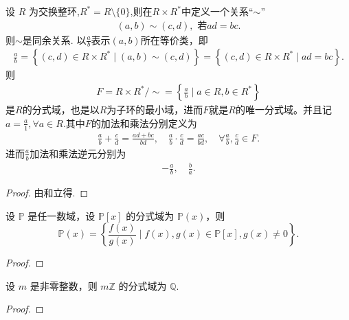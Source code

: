\documentclass[../../main.tex]{subfiles}%
\begin{document}
\begin{corollary}\label{corollary:交换整环的分式与的具体形式}
设 \( R \) 为交换整环,$R^*=R\setminus \{0\}$,则在$R \times R^*$中定义一个关系“$\sim$”
\begin{align*}
\left( a,b \right) \sim \left( c,d \right) ,\,\,\text{若}ad=bc.
\end{align*}
则$\sim$是同余关系.
以$\frac{a}{b}$表示$(a,b)$所在等价类，即
\begin{align*}
\frac{a}{b} =\left\{ (c,d) \in R \times R^* \mid (a,b)\sim (c,d) \right\}= \left\{ (c,d) \in R \times R^* \mid ad = bc \right\}.
\end{align*}
则
\begin{align*}
F = R \times R^*/\sim = \left\{ \frac{a}{b} \mid a \in R, b \in R^* \right\}
\end{align*}
是$R$的分式域，也是以$R$为子环的最小域，进而$F$就是$R$的唯一分式域。并且记$a=\frac{a}{1},\forall a\in R.$其中$F$的加法和乘法分别定义为
\begin{align*}
\frac{a}{b}+\frac{c}{d}=\frac{ad+bc}{bd},\quad \frac{a}{b}\cdot \frac{c}{d}=\frac{ac}{bd},\quad \forall \frac{a}{b},\frac{c}{d}\in F.
\end{align*}
进而$\frac{a}{b}$加法和乘法逆元分别为
\begin{align*}
-\frac{a}{b},\quad \frac{b}{a}.
\end{align*}
\end{corollary}
\begin{proof}

由和立得.

\end{proof}

\begin{example}
设 \( \mathbb{P} \) 是任一数域，设 \( \mathbb{P}[x] \) 的分式域为 \( \mathbb{P}(x) \)，则
\[
\mathbb{P}(x) = \left\{ \frac{f(x)}{g(x)} \mid f(x), g(x) \in \mathbb{P}[x], g(x) \neq 0 \right\}.
\]
\end{example}
\begin{proof}



\end{proof}

\begin{proposition}\label{proposition:mZ的分式域都是Q}
设 \( m \) 是非零整数，则 \( m\mathbb{Z} \) 的分式域为 \( \mathbb{Q} \).
\end{proposition}
\begin{proof}



\end{proof}
\end{document}
